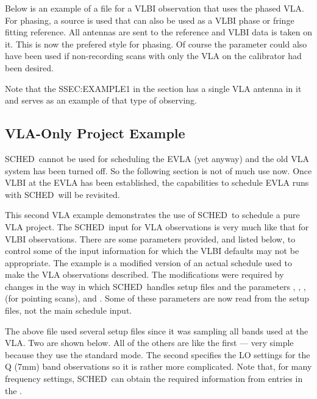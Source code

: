 \documentclass{report}
\newcommand{\schedb}{{\sc SCHED~}}
\begin{document}
Below is an example of a file for a VLBI observation that uses the
phased VLA.  For phasing, a source is used that can also be used as a
VLBI phase or fringe fitting reference.  All antennas are sent to the
reference and VLBI data is taken on it.  This is now the prefered
style for phasing.  Of course the 
parameter could also have been used if non-recording scans with only
the VLA on the calibrator had been desired.

Note that the  {SSEC:EXAMPLE1} in the
 section has a single VLA antenna
in it and serves as an example of that type of observing.


\subsection{\label{SSEC:VLAONLY}VLA-Only Project Example}

\schedb cannot be used for scheduling the EVLA (yet anyway) and the
old VLA system has been turned off.  So the following section is not
of much use now.  Once VLBI at the EVLA has been established, the
capabilities to schedule EVLA runs with \schedb will be revisited.

This second VLA example demonstrates the use of \schedb to schedule a
pure VLA project.  The \schedb input for VLA observations is very much
like that for VLBI observations.  There are some parameters provided,
and listed below, to control some of the input information for which
the VLBI defaults may not be appropriate.  The example is a modified
version of an actual schedule used to make the VLA observations
described.  The modifications were required by changes in the way in
which \schedb handles setup files and the parameters , , ,  (for pointing
scans), and .  Some of these
parameters are now read from the setup files, not the main schedule
input.



The above file used several setup files since it was sampling all
bands used at the VLA.  Two are shown below.  All of the others are
like the first --- very simple because they use the standard mode.
The second specifies the LO settings for the Q (7mm) band observations
so it is rather more complicated.  Note that, for many frequency settings,
\schedb can obtain the required information from entries in the
.
\end{document}
